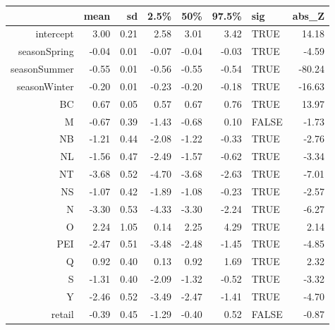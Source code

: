 \documentclass[12pt]{article}
\begin{document}
\begin{table}[ht]
    \centering
    \begin{tabular}{rrrrrrlr}
      \hline
     & mean & sd & 2.5\% & 50\% & 97.5\% & sig & abs\_Z \\ 
      \hline
    intercept & 3.00 & 0.21 & 2.58 & 3.01 & 3.42 & TRUE & 14.18 \\ 
      seasonSpring & -0.04 & 0.01 & -0.07 & -0.04 & -0.03 & TRUE & -4.59 \\ 
      seasonSummer & -0.55 & 0.01 & -0.56 & -0.55 & -0.54 & TRUE & -80.24 \\ 
      seasonWinter & -0.20 & 0.01 & -0.23 & -0.20 & -0.18 & TRUE & -16.63 \\ 
      BC & 0.67 & 0.05 & 0.57 & 0.67 & 0.76 & TRUE & 13.97 \\ 
      M & -0.67 & 0.39 & -1.43 & -0.68 & 0.10 & FALSE & -1.73 \\ 
      NB & -1.21 & 0.44 & -2.08 & -1.22 & -0.33 & TRUE & -2.76 \\ 
      NL & -1.56 & 0.47 & -2.49 & -1.57 & -0.62 & TRUE & -3.34 \\ 
      NT & -3.68 & 0.52 & -4.70 & -3.68 & -2.63 & TRUE & -7.01 \\ 
      NS & -1.07 & 0.42 & -1.89 & -1.08 & -0.23 & TRUE & -2.57 \\ 
      N & -3.30 & 0.53 & -4.33 & -3.30 & -2.24 & TRUE & -6.27 \\ 
      O & 2.24 & 1.05 & 0.14 & 2.25 & 4.29 & TRUE & 2.14 \\ 
      PEI & -2.47 & 0.51 & -3.48 & -2.48 & -1.45 & TRUE & -4.85 \\ 
      Q & 0.92 & 0.40 & 0.13 & 0.92 & 1.69 & TRUE & 2.32 \\ 
      S & -1.31 & 0.40 & -2.09 & -1.32 & -0.52 & TRUE & -3.32 \\ 
      Y & -2.46 & 0.52 & -3.49 & -2.47 & -1.41 & TRUE & -4.70 \\ 
      retail & -0.39 & 0.45 & -1.29 & -0.40 & 0.52 & FALSE & -0.87 \\ 
       \hline
    \end{tabular}
    \end{table}
    
\end{document}
